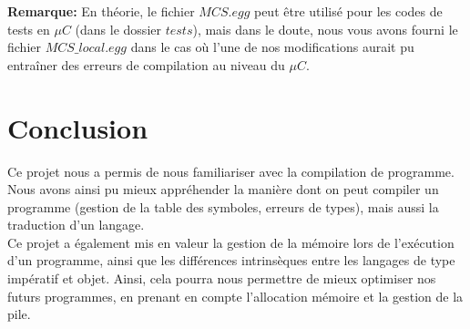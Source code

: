 \documentclass[11pt,a4paper]{report}
\begin{document}
\textbf{Remarque:} En théorie, le fichier $MCS.egg$ peut être utilisé pour les codes de tests en $\mu C$ (dans le dossier $tests$), mais dans le doute, nous vous avons fourni le fichier $MCS\_local.egg$ dans le cas où l'une de nos modifications aurait pu entraîner des erreurs de compilation au niveau du $\mu C$.


\newpage
\section*{Conclusion}


Ce projet nous a permis de nous familiariser avec la compilation de programme. Nous avons ainsi pu mieux appréhender la manière dont on peut compiler un programme (gestion de la table des symboles, erreurs de types), mais aussi la traduction d'un langage. \\
Ce projet a également mis en valeur la gestion de la mémoire lors de l'exécution d'un programme, ainsi que les différences intrinsèques entre les langages de type impératif et objet.
Ainsi, cela pourra nous permettre de mieux optimiser nos futurs programmes, en prenant en compte l'allocation mémoire et la gestion de la pile.
\end{document}
